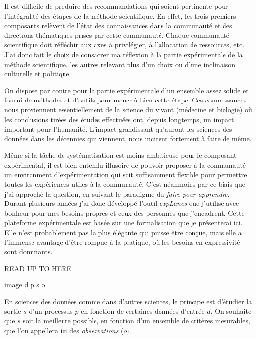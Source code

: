 Il est difficile de produire des recommandations qui soient pertinente pour l'intégralité des étapes de la méthode scientifique. En effet, les trois premiers composants relèvent de l'état des connaissances dans la communauté et des \og directions \fg thématiques prises par cette communauté. Chaque communauté scientifique doit réfléchir aux axes à privilégier, à l'allocation de ressources, etc. J'ai donc fait le choix de consacrer ma réflexion à la partie expérimentale de la méthode scientifique, les autres relevant plus d'un choix ou d'une inclinaison culturelle et politique.

On dispose par contre pour la partie expérimentale d'un ensemble assez solide et fourni de méthodes et d'outils pour mener à bien cette étape. Ces connaissances nous proviennent essentiellement de la science du vivant (médecine et biologie) où les conclusions tirées des études effectuées ont, depuis longtemps, un impact important pour l'humanité. L'impact grandissant qu'auront les sciences des données dans les décennies qui viennent, nous incitent fortement à faire de même.

Même si la tâche de systématisation est moins ambitieuse pour le composant expérimental, il est bien entendu illusoire de pouvoir proposer à la communauté un environment d'expérimentation qui soit suffisamment flexible pour permettre toutes les expériences utiles à la communauté. C'est néanmoins par ce biais que j'ai approché la question, en suivant le paradigme du \textsl{faire pour apprendre}. Durant plusieurs années j'ai donc développé l'outil \textsl{expLanes}\cite{explanes} que j'utilise avec bonheur pour mes besoins propres et ceux des personnes que j'encadrent. Cette plateforme expérimentale est basée sur une formalisation que je présenterai ici. Elle n'est probablement pas la plus élégante qui puisse être conçue, mais elle a l'immense avantage d'être rompue à la pratique, où les besoins en expressivité sont dominants.

READ UP TO HERE

image d p s
        o

En sciences des données comme dans d'autres sciences, le principe est d'étudier la sortie $s$ d'un processus $p$ en fonction de certaines données d'entrée $d$. On souhaite que $s$ soit la meilleure possible, en fonction d'un ensemble de critères mesurables, que l'on appellera ici des \textsl{observations} ($o$).

